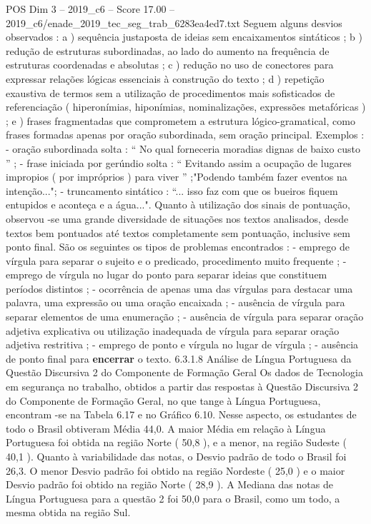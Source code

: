 \begin{textsample}{POS Dim 3 – 2019\_c6 – Score 17.00 – 2019\_c6/enade\_2019\_tec\_seg\_trab\_6283ea4ed7.txt}
Seguem alguns desvios observados : a ) sequência justaposta de ideias sem encaixamentos sintáticos ; b ) redução de estruturas subordinadas, ao lado do aumento na frequência de estruturas coordenadas e absolutas ; c ) redução no uso de conectores para expressar relações lógicas essenciais à construção do texto ; d ) repetição exaustiva de termos sem a utilização de procedimentos mais sofisticados de referenciação ( hiperonímias, hiponímias, nominalizações, expressões metafóricas ) ; e ) frases fragmentadas que comprometem a estrutura lógico-gramatical, como frases formadas apenas por oração subordinada, sem oração principal.
Exemplos : - oração subordinada solta : “ No qual forneceria moradias dignas de baixo custo ” ; - frase iniciada por gerúndio solta : “ Evitando assim a ocupação de lugares impropios ( por impróprios ) para viver ” ;"Podendo também fazer eventos na intenção..."; - truncamento sintático : “... isso faz com que os bueiros fiquem entupidos e aconteça e a água...".
Quanto à utilização dos sinais de pontuação, observou -se uma grande diversidade de situações nos textos analisados, desde textos bem pontuados até textos completamente sem pontuação, inclusive sem ponto final.
São os seguintes os tipos de problemas encontrados : - emprego de vírgula para separar o sujeito e o predicado, procedimento muito frequente ; - emprego de vírgula no lugar do ponto para separar ideias que constituem períodos distintos ; - ocorrência de apenas uma das vírgulas para destacar uma palavra, uma expressão ou uma oração encaixada ; - ausência de vírgula para separar elementos de uma enumeração ; - ausência de vírgula para separar oração adjetiva explicativa ou utilização inadequada de vírgula para separar oração adjetiva restritiva ; - emprego de ponto e vírgula no lugar de vírgula ; - ausência de ponto final para \textbf{encerrar} o texto. 6.3.1.8 Análise de Língua Portuguesa da Questão Discursiva 2 do Componente de Formação Geral Os dados de Tecnologia em segurança no trabalho, obtidos a partir das respostas à Questão Discursiva 2 do Componente de Formação Geral, no que tange à Língua Portuguesa, encontram -se na Tabela 6.17 e no Gráfico 6.10.
Nesse aspecto, os estudantes de todo o Brasil obtiveram Média 44,0.
A maior Média em relação à Língua Portuguesa foi obtida na região Norte ( 50,8 ), e a menor, na região Sudeste ( 40,1 ).
Quanto à variabilidade das notas, o Desvio padrão de todo o Brasil foi 26,3.
O menor Desvio padrão foi obtido na região Nordeste ( 25,0 ) e o maior Desvio padrão foi obtido na região Norte ( 28,9 ).
A Mediana das notas de Língua Portuguesa para a questão 2 foi 50,0 para o Brasil, como um todo, a mesma obtida na região Sul.

\end{textsample}
